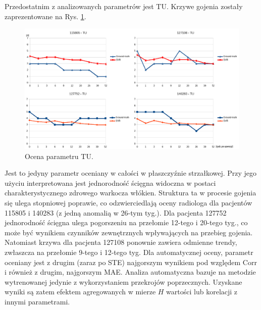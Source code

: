 Przedostatnim z analizowanych parametrów jest TU. Krzywe gojenia zostały zaprezentowane na Rys. \ref{fig:TU}.  
\begin{figure}[h!]
	\centering
	\includegraphics[width=1\textwidth]{figures/TU.png}
	\caption{Ocena parametru TU.}\label{fig:TU}
\end{figure}
Jest to jedyny parametr oceniany w całości w płaszczyźnie strzałkowej. Przy jego użyciu interpretowana jest jednorodność ścięgna widoczna w postaci charakterystycznego zdrowego warkocza włókien. Struktura \linebreak ta w procesie gojenia się ulega stopniowej poprawie, co odzwierciedlają oceny radiologa dla pacjentów 115805 i 140283 (z jedną anomalią w 26-tym tyg.). Dla pacjenta 127752 jednorodność ścięgna ulega pogorszeniu na przełomie 12-tego i 20-tego tyg., co może być wynikiem czynników zewnętrznych wpływających na przebieg gojenia. Natomiast krzywa dla pacjenta 127108 ponownie zawiera odmienne trendy, zwłaszcza na przełomie 9-tego i 12-tego tyg. Dla automatycznej oceny, parametr oceniany jest z drugim (zaraz po STE) najgorszym wynikiem pod względem Corr i również \linebreak z drugim, najgorszym MAE. Analiza automatyczna bazuje na metodzie wytrenowanej jedynie z wykorzystaniem przekrojów poprzecznych. Uzyskane wyniki są zatem efektem agregowanych w mierze $H$ wartości lub korelacji z innymi parametrami. 

